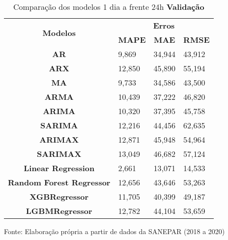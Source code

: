 \begin{table}[H]
	\centering
	\caption{Comparação dos modelos 1 dia a frente 24h \textbf{Validação} }\label{tb:1-24vld}
	\begin{tabular}{@{}clll@{}}
		\toprule
		\multirow{2}{*}{\textbf{Modelos}} & \multicolumn{3}{c}{\textbf{Erros}}                                                                       \\ \cmidrule(l){2-4} 
		& \multicolumn{1}{c}{\textbf{MAPE}} & \multicolumn{1}{c}{\textbf{MAE}} & \multicolumn{1}{c}{\textbf{RMSE}} \\ \hline
\textbf{AR}                       & 9,869                             & 34,944                           & 43,912                            \\
\textbf{ARX}                      & 12,850                            & 45,890                           & 55,194                            \\
\textbf{MA}                       & 9,733                             & 34,586                           & 43,500                            \\
\textbf{ARMA}                     & 10,439                            & 37,222                           & 46,820                            \\
\textbf{ARIMA}                    & 10,320                            & 37,395                           & 45,758                            \\
\textbf{SARIMA}                   & 12,216                            & 44,456                           & 62,635                            \\
\textbf{ARIMAX}                   & 12,871                            & 45,948                           & 54,964                            \\
\textbf{SARIMAX}                  & 13,049                            & 46,682                           & 57,124                            \\
\textbf{Linear Regression}        & 2,661                             & 13,071                           & 14,533                            \\
\textbf{Random Forest Regressor}  & 12,656                            & 43,646                           & 53,263                            \\
\textbf{XGBRegressor}             & 11,705                            & 40,399                           & 49,187                            \\
\textbf{LGBMRegressor}            & 12,782                            & 44,104                           & 53,659                            \\ \bottomrule
	\end{tabular}

Fonte: Elaboração própria a partir de dados da SANEPAR (2018 a 2020)
\end{table}

